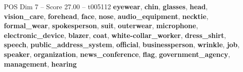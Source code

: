 \begin{textsample}{POS Dim 7 – Score 27.00 – t005112}  \label{ex:f7_pos_029}
\textbf{eyewear}, \textbf{chin}, \textbf{glasses}, \textbf{head}, \textbf{vision\_care}, \textbf{forehead}, \textbf{face}, \textbf{nose}, \textbf{audio\_equipment}, \textbf{necktie}, \textbf{formal\_wear}, \textbf{spokesperson}, \textbf{suit}, \textbf{outerwear}, \textbf{microphone}, \textbf{electronic\_device}, \textbf{blazer}, \textbf{coat}, \textbf{white-collar\_worker}, \textbf{dress\_shirt}, \textbf{speech}, \textbf{public\_address\_system}, \textbf{official}, \textbf{businessperson}, \textbf{wrinkle}, \textbf{job}, \textbf{speaker}, \textbf{organization}, \textbf{news\_conference}, \textbf{flag}, \textbf{government\_agency}, \textbf{management}, \textbf{hearing}

\end{textsample}
